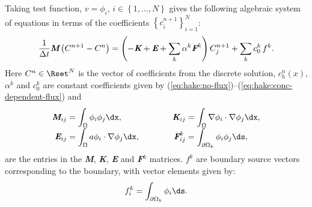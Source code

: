 Taking test function, $v=\phi_i$, $i\in\left\{1,\ldots,N\right\}$
gives the following algebraic system of equations in terms of the
coefficients $\left\{ c^{n+1}_i\right\}^N_{i=1}$:
\begin{equation}
  \label{eq:hake:algebraic-equation}
  \frac{1}{\Delta{}t}\text{\bfseries\itshape M}\left(C^{n+1}-C^n\right) =  \left(-\text{\bfseries\itshape K}+\text{\bfseries\itshape E}+\sum_k\alpha^k\text{\bfseries\itshape F}^k\right)C_j^{n+1}+\sum_k c_0^k\,f^k.
\end{equation}
Here $C^n\in \Rset^N$ is the vector of coefficients from the discrete
solution, $c^n_h(x)$, $\alpha^k$ and $c_0^k$ are constant coefficients
given by (\ref{eq:hake:no-flux})--(\ref{eq:hake:conc-dependent-flux})
and\\[-1.0em]
\begin{equation}
  \renewcommand{\arraystretch}{1.7}
  \renewcommand{\baselinestretch}{1.7}
  \begin{array}{r@{\;=\;}lcr@{\;=\;}l}
    \text{\bfseries\itshape M}_{ij}&\displaystyle\int_\Omega\phi_i\phi_j \dx,& \quad\quad&\text{\bfseries\itshape K}_{ij}&\displaystyle\int_\Omega\nabla\phi_i\cdot\nabla\phi_j \dx,\\
    \text{\bfseries\itshape E}_{ij}&\displaystyle\int_\Omega a\phi_i\cdot\nabla\phi_j \dx,& \quad\quad&\text{\bfseries\itshape F}^k_{ij}&\displaystyle\int_{\partial\Omega_k}\phi_i\phi_j \ds,
  \end{array}
  \renewcommand{\arraystretch}{1}
  \renewcommand{\baselinestretch}{1}
  \label{eq:hake:matrices}
\end{equation}
are the entries in the {\bfseries\itshape M}, {\bfseries\itshape K},
{\bfseries\itshape E} and {\bfseries\itshape F}$^k$ matrices. $f^k$
are boundary source vectors corresponding to the \kth boundary, with
vector elements given by:
\begin{equation}
  \label{eq:hake:vector}
  f^k_{i}=\int_{\partial\Omega_k}\phi_i \ds.
\end{equation}

